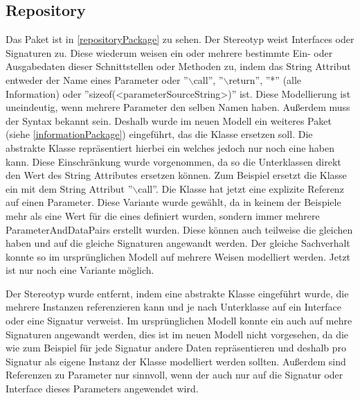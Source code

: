 \documentclass[twoside, ngerman]{sdqseminar}
\begin{document}
\subsection{Repository}
Das Paket  ist in \autoref{repositoryPackage} zu sehen.
Der  Stereotyp weist Interfaces oder Signaturen  zu. Diese wiederum weisen ein oder mehrere  bestimmte Ein- oder Ausgabedaten dieser Schnittstellen oder Methoden zu, indem das String Attribut  entweder der Name eines Parameter oder ''$\backslash$call'', ''$\backslash$return'', ''*'' (alle Information) oder ''sizeof(<parameterSourceString>)'' ist. Diese Modellierung ist uneindeutig, wenn mehrere Parameter den selben Namen haben. Außerdem muss der Syntax bekannt sein. Deshalb wurde im neuen Modell ein weiteres Paket  (siehe \autoref{informationPackage}) eingeführt, das die  Klasse ersetzen soll. Die abstrakte Klasse  repräsentiert hierbei ein  welches jedoch nur noch eine  haben kann. Diese Einschränkung wurde vorgenommen, da so die Unterklassen direkt den Wert des String Attributes ersetzen können. Zum Beispiel ersetzt die Klasse  ein  mit dem String Attribut ''$\backslash$call''. Die Klasse   hat jetzt eine explizite Referenz auf einen Parameter. Diese Variante wurde gewählt, da in keinem der Beispiele mehr als eine Wert für die  eines  definiert wurden, sondern immer mehrere ParameterAndDataPairs erstellt wurden. Diese können auch teilweise die gleichen  haben und auf die gleiche Signaturen angewandt werden. Der gleiche Sachverhalt konnte so im ursprünglichen Modell auf mehrere Weisen modelliert werden. Jetzt ist nur noch eine Variante möglich.

Der  Stereotyp wurde entfernt, indem eine abstrakte Klasse  eingeführt wurde, die mehrere  Instanzen referenzieren kann und je nach Unterklasse auf ein Interface oder eine Signatur verweist. Im ursprünglichen Modell konnte ein  auch auf mehre Signaturen angewandt werden, dies ist im neuen Modell nicht vorgesehen, da die  wie zum Beispiel  für jede Signatur andere Daten repräsentieren und deshalb pro Signatur als eigene Instanz der Klasse modelliert werden sollten. Außerdem sind Referenzen zu Parameter nur sinnvoll, wenn der  auch nur auf die Signatur oder Interface dieses Parameters angewendet wird.
\end{document}
